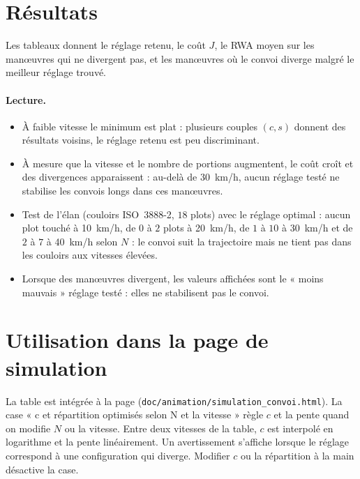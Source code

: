 \documentclass[a4paper,11pt]{article}
\begin{document}
\section{Résultats}
Les tableaux donnent le réglage retenu, le coût $J$, le RWA moyen sur les manœuvres qui ne divergent pas, et les manœuvres où le convoi diverge malgré le meilleur réglage trouvé.


\paragraph{Lecture.}
\begin{itemize}
  \item À faible vitesse le minimum est plat : plusieurs couples $(c,s)$ donnent des résultats voisins, le réglage retenu est peu discriminant.
  \item À mesure que la vitesse et le nombre de portions augmentent, le coût croît et des divergences apparaissent : au-delà de \SI{30}{km/h}, aucun réglage testé ne stabilise les convois longs dans ces manœuvres.
  \item Test de l'élan (couloirs ISO~3888-2, $18$ plots) avec le réglage optimal : aucun plot touché à \SI{10}{km/h}, de $0$ à $2$ plots à \SI{20}{km/h}, de $1$ à $10$ à \SI{30}{km/h} et de $2$ à $7$ à \SI{40}{km/h} selon $N$ : le convoi suit la trajectoire mais ne tient pas dans les couloirs aux vitesses élevées.
  \item Lorsque des manœuvres divergent, les valeurs affichées sont le « moins mauvais » réglage testé : elles ne stabilisent pas le convoi.
\end{itemize}

\section{Utilisation dans la page de simulation}
La table est intégrée à la page (\texttt{doc/animation/simulation\_convoi.html}). La case « c et répartition optimisés selon N et la vitesse » règle $c$ et la pente quand on modifie $N$ ou la vitesse. Entre deux vitesses de la table, $c$ est interpolé en logarithme et la pente linéairement. Un avertissement s'affiche lorsque le réglage correspond à une configuration qui diverge. Modifier $c$ ou la répartition à la main désactive la case.
\end{document}
